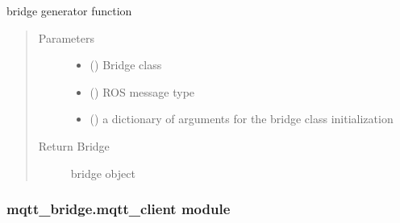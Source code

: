 \documentclass[letterpaper,10pt,english]{sphinxmanual}
\begin{document}
\begin{fulllineitems}
\label{\detokenize{source/mqtt_bridge/mqtt_bridge:mqtt_bridge.bridge.create_bridge}}
bridge generator function
\begin{quote}\begin{description}
\item[{Parameters}] \leavevmode\begin{itemize}
\item {} 
 () \textendash{} Bridge class

\item {} 
 () \textendash{} ROS message type

\item {} 
 () \textendash{} a dictionary of arguments for the bridge class initialization

\end{itemize}

\item[{Return Bridge}] \leavevmode
bridge object

\end{description}\end{quote}

\end{fulllineitems}



\subsubsection{mqtt\_bridge.mqtt\_client module}
\label{\detokenize{source/mqtt_bridge/mqtt_bridge:module-mqtt_bridge.mqtt_client}}\label{\detokenize{source/mqtt_bridge/mqtt_bridge:mqtt-bridge-mqtt-client-module}}
\end{document}
